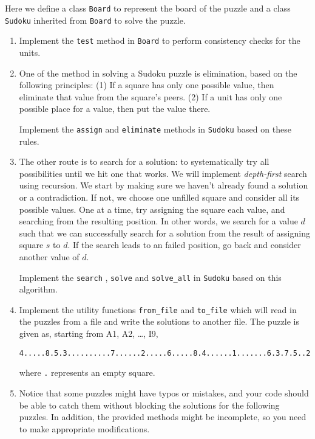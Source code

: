 \documentclass[12pt]{article}
\begin{document}
Here we define a class \verb!Board! to represent the board of the puzzle and a class \verb!Sudoku! inherited from \verb!Board! to solve the puzzle.
\begin{enumerate}
\item Implement the  \verb!test! method in \verb!Board! to perform  consistency checks for the units.
\item One of the method in solving a Sudoku puzzle is elimination, based on the following principles: (1) If a square has only one possible value, then eliminate that value from the square's peers. (2) If a unit has only one possible place for a value, then put the value there. 

Implement the \verb!assign! and \verb!eliminate! methods in   \verb!Sudoku! based on these rules.
\item The other route is to search for a solution: to systematically try all possibilities until we hit one that works. We will implement \textit{depth-first} search using recursion. We start by making sure we haven't already found a solution or a contradiction. If not, we choose one unfilled square and consider all its possible values. One at a time, try assigning the square each value, and searching from the resulting position. In other words, we search for a value $d$ such that we can successfully search for a solution from the result of assigning square $s$ to $d$. If the search leads to an failed position, go back and consider another value of $d$. 

Implement the \verb!search! , \verb!solve! and \verb!solve_all! in \verb!Sudoku! based on this algorithm.
\item Implement the utility functions \verb!from_file! and \verb!to_file! which will read in the puzzles from a file and write the solutions to another file.  The puzzle is given as, starting from A1, A2, \ldots, I9, 
\begin{scriptsize}
\begin{verbatim}
4.....8.5.3..........7......2.....6.....8.4......1.......6.3.7.5..2.....1.4......
\end{verbatim}
\end{scriptsize}
where \verb!.! represents an empty square. 
\item Notice that some puzzles might have typos or mistakes, and your code should be able to catch them without blocking the solutions for the following puzzles. In addition, the provided methods might be incomplete, so you need to make appropriate modifications. 
\end{enumerate} 
\end{document}
